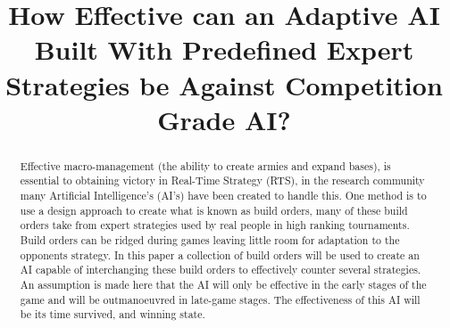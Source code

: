 \documentclass[journal]{IEEEtran}
\begin{document}
%
\title{%
	How Effective can an Adaptive AI Built With Predefined Expert Strategies be Against Competition Grade AI?} %

%
%
\author{
}


\maketitle

\begin{abstract}
Effective macro-management (the ability to create armies and expand bases), is essential to obtaining victory in Real-Time Strategy (RTS), in the research community many Artificial Intelligence's (AI's) have been created to handle this. One method is to use a design approach to create what is known as build orders, many of these build orders take from expert strategies used by real people in high ranking tournaments. Build orders can be ridged during games leaving little room for adaptation to the opponents strategy. In this paper a collection of build orders will be used to create an AI capable of interchanging these build orders to effectively counter several strategies. An assumption is made here that the AI will only be effective in the early stages of the game and will be outmanoeuvred in late-game stages. The effectiveness of this AI will be its time survived, and winning state.
\end{abstract}
\end{document}

